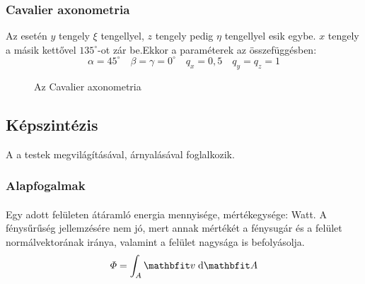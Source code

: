 \documentclass[../../main.tex]{subfiles}
\begin{document}
\subsubsection{Cavalier axonometria}

Az  esetén $y$ tengely $\xi$ tengellyel, $z$ tengely
pedig $\eta$ tengellyel esik egybe. $x$ tengely a másik kettővel $135^\circ$-ot
zár be.Ekkor a paraméterek az összefüggésben:
\[
  \alpha = 45^\circ
  \quad
  \beta = \gamma = 0^\circ
  \quad
  q_x = 0,5
  \quad
  q_y = q_z = 1
\]
\begin{figure}[H]
  \centering
  \caption{Az Cavalier axonometria}
  \label{fig:cavalier}
\end{figure}

\subsection{Képszintézis}

A  a testek megvilágításával, árnyalásával foglalkozik.

\subsubsection{Alapfogalmak}

\paragraph*{}
Egy adott felületen átáramló energia mennyisége, mértékegysége: Watt.
A fénysűrűség jellemzésére nem jó, mert annak mértékét a fénysugár és a felület
normálvektorának iránya, valamint a felület nagysága is befolyásolja.
\[
  \varPhi = \int_{A} \rvec v \; \dd \rvec A
\]
\end{document}
